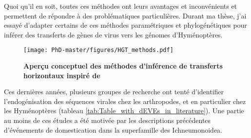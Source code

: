 Quoi qu'il en soit, toutes ces méthodes ont leurs avantages et inconvénients et permettent de répondre à des problématiques particulières. Durant ma thèse, j'ai essayé d'adapter certains de ces méthodes paramétriques et phylogénétiques pour inférer des transferts de gènes de virus vers les génomes d'Hyménoptères.  

\begin{figure}[!htpb]
\captionsetup{font=footnotesize}
 \centering
  \texttt{[image: PhD-master/figures/HGT\_methods.pdf]}
\caption[Methode:Aperçu conceptuel des méthodes d'inférence de transferts horizontaux]{\textbf{Aperçu conceptuel des méthodes d'inférence de transferts horizontaux inspiré de \cite{ravenhall_inferring_2015}}}
\label{figure:HGT_methods}
\end{figure}

Ces dernières années, plusieurs groupes de recherche ont tenté d'identifier l'endogénisation des séquences virales chez les arthropodes, et en particulier chez les Hyménoptères (tableau \ref{tab:Table_with_dEVEs_in_literature}). Une partie au moins de ces études a été motivée par les descriptions précédentes d'événements de domestication dans la superfamille des Ichneumonoidea.



